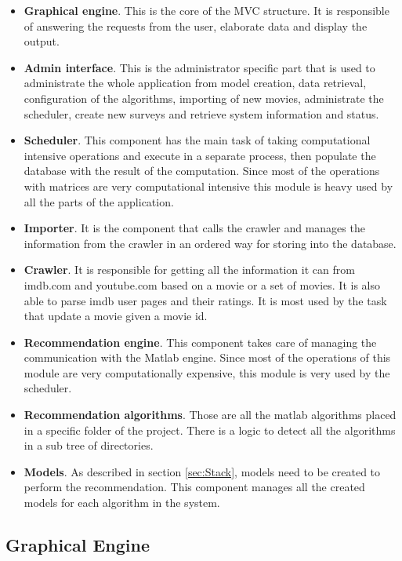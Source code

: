 \begin{itemize}
\item \textbf{Graphical engine}. This is the core of the \ac{MVC} structure. It is responsible of answering the requests from the user, elaborate data and display the output.
\item \textbf{Admin interface}. This is the administrator specific part that is used to administrate the whole application from model creation, data retrieval, configuration of the algorithms, importing of new movies, administrate the scheduler, create new surveys and retrieve system information and status.
\item \textbf{Scheduler}. This component has the main task of taking computational intensive operations and execute in a separate process, then populate the database with the result of the computation. Since most of the operations with matrices are very computational intensive this module is heavy used by all the parts of the application.
\item \textbf{Importer}. It is the component that calls the crawler and manages the information from the crawler in an ordered way for storing into the database.
\item \textbf{Crawler}. It is responsible for getting all the information it can from imdb.com and youtube.com based on a movie or a set of movies. It is also able to parse imdb user pages and their ratings. It is most used by the task that update a movie given a movie id.
\item \textbf{Recommendation engine}. This component takes care of managing the communication with the Matlab engine. Since most of the operations of this module are very computationally expensive, this module is very used by the scheduler.
\item \textbf{Recommendation algorithms}. Those are all the matlab algorithms placed in a specific folder of the project. There is a logic to detect all the algorithms in a sub tree of directories.
\item \textbf{Models}. As described in section \ref{sec:Stack}, models need to be created to perform the recommendation. This component manages all the created models for each algorithm in the system.
\end{itemize}

\subsection{Graphical Engine}
\label{sec:graphical-engine}

